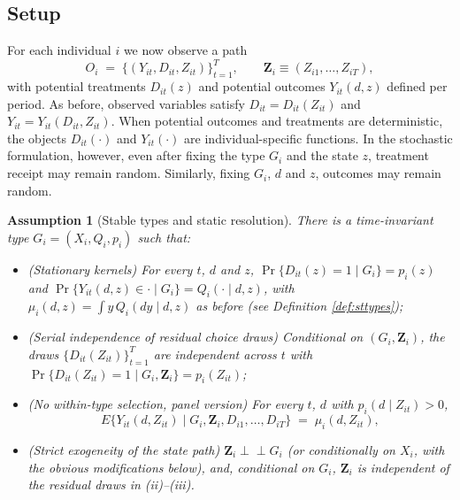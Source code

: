\documentclass[11pt]{article}
\newtheorem{assumption}{Assumption}
\newcommand{\1}{\mathbf{1}}
\begin{document}
\subsection{Setup}
\label{subsec:panel-setup}

For each individual $i$ we now observe a path
\[
O_i \;=\; \{(Y_{it}, D_{it}, Z_{it})\}_{t=1}^{T},
\qquad \mathbf{Z}_i \equiv (Z_{i1},\ldots,Z_{iT}),
\]
with potential treatments $D_{it}(z)$ and potential outcomes $Y_{it}(d,z)$ defined per period. As before, observed variables satisfy $D_{it} = D_{it}(Z_{it})$ and $Y_{it} = Y_{it}(D_{it}, Z_{it})$.  When potential outcomes and treatments are deterministic, the objects
\(D_{it}(\cdot)\) and \(Y_{it}(\cdot)\) are individual-specific functions. In the
stochastic formulation, however, even after fixing the type \(G_i\) and the
state \(z\), treatment receipt may remain random.  Similarly, fixing $G_i$, $d$ and $z$, outcomes may remain random.

\begin{assumption}[Stable types and static resolution]
\label{ass:paneltypes}
There is a time-invariant type $G_i = (X_i, Q_i, p_i)$ such that:
\begin{itemize}
\item[(i)] (\emph{Stationary kernels}) For every $t$, $d$ and $z$,
$\Pr\{D_{it}(z) = 1 \mid G_i\} = p_i(z)$ and $\Pr\{Y_{it}(d,z) \in \cdot \mid G_i\} = Q_i(\cdot \mid d, z)$, with $\mu_i(d,z) = \int y \, Q_i(dy \mid d,z)$ as before (see Definition \ref{def:sttypes});
\item[(ii)] (\emph{Serial independence of residual choice draws}) Conditional on $(G_i, \mathbf{Z}_i)$, the draws $\{D_{it}(Z_{it})\}_{t=1}^{T}$ are independent across $t$ with $\Pr\{D_{it}(Z_{it}) = 1 \mid G_i, \mathbf{Z}_i\} = p_i(Z_{it})$;
\item[(iii)] (\emph{No within-type selection, panel version}) For every $t$, $d$ with $p_i(d \mid Z_{it}) > 0$,
\[
E\{Y_{it}(d, Z_{it}) \mid G_i, \mathbf{Z}_i, D_{i1},\ldots,D_{iT}\} \;=\; \mu_i(d, Z_{it}),
\]
\item[(iv)] (\emph{Strict exogeneity of the state path}) $\mathbf{Z}_i \perp\!\!\!\perp G_i$ (or conditionally on $X_i$, with the obvious modifications below), and, conditional on $G_i$, $\mathbf{Z}_i$ is independent of the residual draws in (ii)--(iii).
\end{itemize}
\end{assumption}
\end{document}
